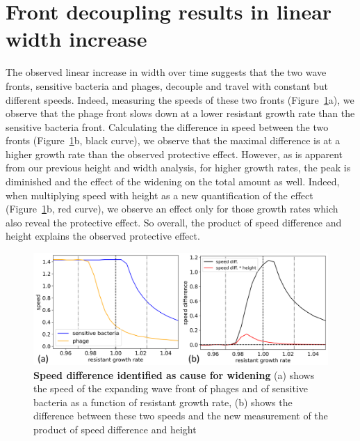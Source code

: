 \section{Front decoupling results in linear width increase}
The observed linear increase in width over time suggests that the two wave fronts, sensitive bacteria and phages, decouple and travel with constant but different speeds. Indeed, measuring the speeds of these two fronts (Figure~\ref{fig:results_speed_height}a), we observe that the phage front slows down at a lower resistant growth rate than the sensitive bacteria front. Calculating the difference in speed between the two fronts (Figure~\ref{fig:results_speed_height}b, black curve), we observe that the maximal difference is at a higher growth rate than the observed protective effect. However, as is apparent from our previous height and width analysis, for higher growth rates, the peak is diminished and the effect of the widening on the total amount as well. Indeed, when multiplying speed with height as a new quantification of the effect (Figure~\ref{fig:results_speed_height}b, red curve), we observe an effect only for those growth rates which also reveal the protective effect. So overall, the product of speed difference and height explains the observed protective effect. 

\begin{figure}
\centering
\includegraphics[width=\linewidth]{graphics/2025_09_30_phages_fig8.png}
\caption{\textbf{Speed difference identified as cause for widening} (a) shows the speed of the expanding wave front of phages and of sensitive bacteria as a function of resistant growth rate, (b) shows the difference between these two speeds and the new measurement of the product of speed difference and height}
\label{fig:results_speed_height}
\end{figure}

